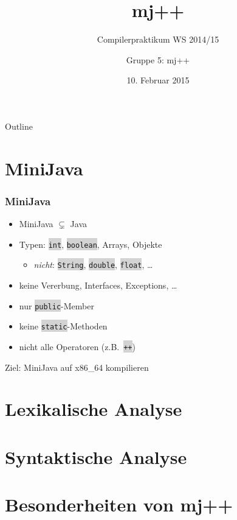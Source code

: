 \documentclass[18pt]{beamer}
\title[]{mj++}
\subtitle{Compilerpraktikum WS 2014/15}
\author{Gruppe 5: mj++}
\date{10. Februar 2015}
\institute{Institut für Programmstrukturen und Datenorganistation}
\newcommand{\code}[1]{\colorbox{lightgray}{\texttt{\upshape #1}}}
\begin{document}

\begin{frame}
\titlepage
\end{frame}

\begin{frame}{Outline}
\tableofcontents
\end{frame}

\section{MiniJava}

\begin{frame}
    \frametitle{MiniJava}
    \begin{itemize}
        \item MiniJava $\subsetneq$ Java
        \item Typen: \code{int}, \code{boolean}, Arrays, Objekte
            \begin{itemize}
                \item \emph{nicht}: \code{String}, \code{double}, \code{float}, \ldots
            \end{itemize}
        \item keine Vererbung, Interfaces, Exceptions, \ldots
        \item nur \code{public}-Member
        \item keine \code{static}-Methoden
        \item nicht alle Operatoren (z.B.\ \code{++})
    \end{itemize}
    \vskip 1cm
    \begin{center}
        Ziel: MiniJava auf x86\_64 kompilieren
    \end{center}
\end{frame}

\section{Lexikalische Analyse}


\section{Syntaktische Analyse}


\section{Besonderheiten von mj++}

\end{document}
